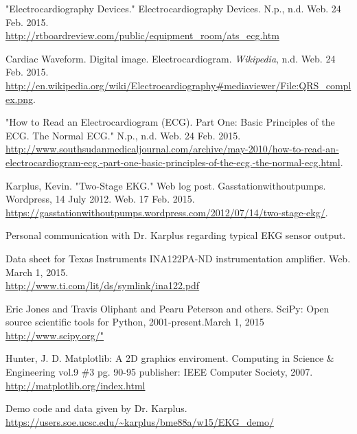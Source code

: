 \documentclass[11pt, oneside]{article}   	%
\begin{document}
\pagebreak
\begin{thebibliography}{9}

"Electrocardiography Devices." Electrocardiography Devices. N.p., n.d. Web. 24 Feb. 2015. \\ \url{http://rtboardreview.com/public/equipment_room/ats_ecg.htm}

Cardiac Waveform. Digital image. Electrocardiogram. \textit{Wikipedia}, n.d. Web. 24 Feb. 2015. \\ \url{http://en.wikipedia.org/wiki/Electrocardiography#mediaviewer/File:QRS_complex.png}.

"How to Read an Electrocardiogram (ECG). Part One: Basic Principles of the ECG. The Normal ECG." N.p., n.d. Web. 24 Feb. 2015. \\ \url{http://www.southsudanmedicaljournal.com/archive/may-2010/how-to-read-an-electrocardiogram-ecg.-part-one-basic-principles-of-the-ecg.-the-normal-ecg.html}.

Karplus, Kevin. "Two-Stage EKG." Web log post. Gasstationwithoutpumps. Wordpress, 14 July 2012. Web. 17 Feb. 2015. \\ \url{https://gasstationwithoutpumps.wordpress.com/2012/07/14/two-stage-ekg/}.

Personal communication with Dr. Karplus regarding typical EKG sensor output.

Data sheet for Texas Instruments INA122PA-ND instrumentation amplifier. Web. March 1, 2015.\\ \url{http://www.ti.com/lit/ds/symlink/ina122.pdf}

Eric Jones and Travis Oliphant and Pearu Peterson and others. SciPy: Open source scientific tools for Python, 2001-present.March 1, 2015 \\ \url{http://www.scipy.org/"}

Hunter, J. D. Matplotlib: A 2D graphics enviroment.
Computing in Science \& Engineering vol.9 \#3 pg. 90-95
publisher: IEEE Computer Society, 2007. \\ \url{http://matplotlib.org/index.html}

Demo code and data given by Dr. Karplus. \url{https://users.soe.ucsc.edu/~karplus/bme88a/w15/EKG_demo/}


\end{thebibliography}
\end{document}
